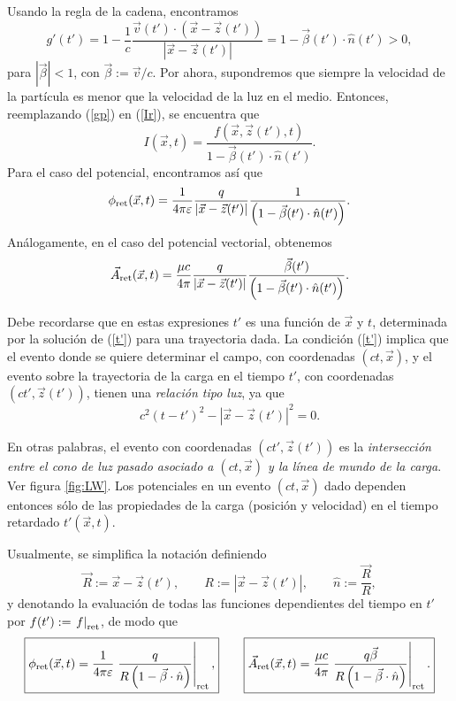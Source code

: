 Usando la regla de la cadena, encontramos
\begin{equation}
 g'(t')=1-\frac{1}{c}\frac{\vec{v}(t')\cdot\left(\vec{x}-\vec{z}(t')\right)}{\left|\vec{x}-\vec{z}(t')\right|}=1-\vec{\beta}(t')\cdot\hat{n}(t')>0 \label{gp},
\end{equation}
para $|\vec\beta|<1$, con $\vec\beta:=\vec{v}/c$. Por ahora, supondremos que siempre la velocidad de la partícula es menor que la velocidad de la luz en el medio. Entonces, reemplazando (\ref{gp}) en (\ref{Ir}), se encuentra que
\begin{equation}
 I(\vec{x},t)=\frac{f(\vec{x},\vec{z}(t'),t)}{1-\vec{\beta}(t')\cdot\hat{n}(t')}. \label{Ir2}
\end{equation}
Para el caso del potencial, encontramos así que
\begin{equation}
\phi_{\rm ret}(\vec{x},t)=\frac{1}{4\pi\varepsilon}\frac{q}{\left|\vec{x}-\vec{z}(t')\right|}\frac{1}{\left( 1-\vec\beta(t')\cdot\hat{n}(t')\right) }.
 \end{equation}
Análogamente, en el caso del potencial vectorial, obtenemos
\begin{equation}
\vec{A}_{\rm ret}(\vec{x},t)=\frac{\mu c}{4\pi}\frac{q}{\left|\vec{x}-\vec{z}(t')\right|}
\frac{\vec{\beta}(t')}{\left( 1-\vec\beta(t')\cdot\hat{n}(t')\right) }.
 \end{equation}
 
Debe recordarse que en estas expresiones $t'$ es una función de $\vec{x}$ y $t$, determinada por la solución de (\ref{t'}) para una trayectoria dada. La condición (\ref{t'}) implica que el evento donde se quiere determinar el campo, con coordenadas $(ct,\vec{x})$, y el evento sobre la trayectoria de la carga en el tiempo $t'$, con coordenadas $(ct',\vec{z}(t'))$, tienen una \textit{relación tipo luz}, ya que
\begin{equation}
 c^2(t-t')^2-|\vec{x}-\vec{z}(t')|^2=0.
\end{equation}

En otras palabras, el evento con coordenadas $(ct',\vec{z}(t'))$ es la \textit{intersección entre el cono de luz pasado asociado a $(ct,\vec{x})$ y la línea de mundo de la carga}. Ver figura \ref{fig:LW}. Los potenciales en un evento $(ct,\vec{x})$ dado dependen entonces sólo de las propiedades de la carga (posición y velocidad) en el tiempo retardado $t'(\vec{x},t)$.

Usualmente, se simplifica la notación definiendo
\begin{equation}
 \vec{R}:=\vec{x}-\vec{z}(t'), \qquad R:=\left|\vec{x}-\vec{z}(t')\right|, \qquad \hat{n}:=\frac{\vec{R}}{R}, \label{defR}
\end{equation}
y denotando la evaluación de todas las funciones dependientes del tiempo en $t'$ por $f(t'):=\left.f\right|_{\rm ret}$, de modo que
\begin{equation}
\boxed{\phi_{\rm ret}(\vec{x},t)=\frac{1}{4\pi\varepsilon}\left. \frac{q}{ R\left(
1-\vec{\beta}\cdot\hat{n}\right) }\right|_{\rm ret}, } \qquad
\boxed{\vec{A}_{\rm ret}(\vec{x},t)=\frac{\mu c}{4\pi}\left. \frac{q\vec{\beta}}{ R\left(1-\vec{\beta}\cdot\hat{n}\right) }\right|_{\rm ret}.} \label{potretq}
\end{equation}

